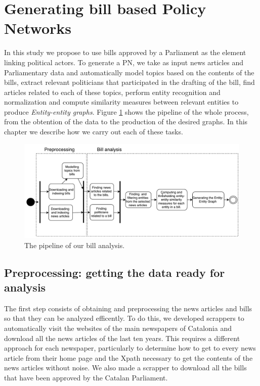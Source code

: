 \section{Generating bill based Policy Networks}\label{sec:implementation}

In this study we propose to use bills approved by a Parliament as the element linking political actors. To generate a PN, we take as input news articles and Parliamentary data and automatically model topics based on the contents of the bills, extract relevant politicians that participated in the drafting of the bill, find articles related to each of these topics, perform entity recognition and normalization and compute similarity measures between relevant entities to produce \emph{Entity-entity graphs}. Figure \ref{fig:pipeline_bill} shows the pipeline of the whole process, from the obtention of the data to the production of the desired graphs. In this chapter we describe how we carry out each of these tasks. \\

\begin{figure}[h!]
    \centering
    \includegraphics[width=1\textwidth]{figs/Analyze_bill}
    \caption{The pipeline of our bill analysis.}
    \label{fig:pipeline_bill}
\end{figure}

\subsection{Preprocessing: getting the data ready for analysis} \label{subsec:preprocessing}

The first step consists of obtaining and preprocessing the news articles and bills so that they can be analyzed efficently. To do this, we developed scrappers to automatically visit the websites of the main newspapers of Catalonia and download all the news articles of the last ten years. This requires a different approach for each newspaper, particularly to determine how to get to every news article from their home page and the Xpath necessary to get the contents of the news articles without noise. We also made a scrapper to download all the bills that have been approved by the Catalan Parliament. \\

